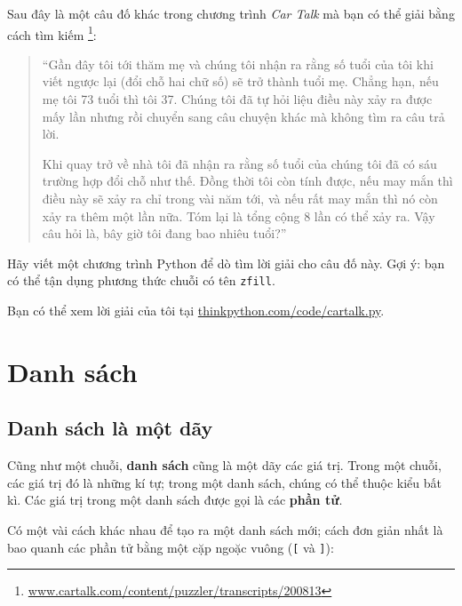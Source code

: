 \documentclass[11pt]{book}
\begin{document}
\begin{ex}
Sau đây là một câu đố khác trong chương trình {\em Car Talk} mà bạn có
thể giải bằng cách tìm kiếm
\footnote{\url{www.cartalk.com/content/puzzler/transcripts/200813}}:


\begin{quote}
``Gần đây tôi tới thăm mẹ và chúng tôi nhận ra rằng số tuổi của tôi 
khi viết ngược lại (đổi chỗ hai chữ số) sẽ trở thành tuổi mẹ. Chẳng hạn,
nếu mẹ tôi 73 tuổi thì tôi 37. Chúng tôi đã tự hỏi liệu điều này xảy ra
được mấy lần nhưng rồi chuyển sang câu chuyện khác mà không tìm ra
câu trả lời.

Khi quay trở về nhà tôi đã nhận ra rằng số tuổi của chúng tôi đã có
sáu trường hợp đổi chỗ như thế. Đồng thời tôi còn tính được, nếu may
mắn thì điều này sẽ xảy ra chỉ trong vài năm tới, và nếu rất may mắn
thì nó còn xảy ra thêm một lần nữa. Tóm lại là tổng cộng 8 lần có thể
xảy ra. Vậy câu hỏi là, bây giờ tôi đang bao nhiêu tuổi?''
\end{quote}

Hãy viết một chương trình Python để dò tìm lời giải cho câu đố này.
Gợi ý: bạn có thể tận dụng phương thức chuỗi có tên {\tt zfill}.

Bạn có thể xem lời giải của tôi tại \url{thinkpython.com/code/cartalk.py}.

\end{ex}



\chapter{Danh sách}



\section{Danh sách là một dãy}

Cũng như một chuỗi, {\bf danh sách} cũng là một dãy các giá trị. Trong một chuỗi,
các giá trị đó là những kí tự; trong một danh sách, chúng có thể 
thuộc kiểu bất kì. Các giá trị trong một danh sách được gọi 
là các {\bf phần tử}.


Có một vài cách khác nhau để tạo ra một danh sách mới; cách đơn
giản nhất là bao quanh các phần tử bằng một cặp ngoặc vuông (\verb"[" và \verb"]"):
\end{document}
